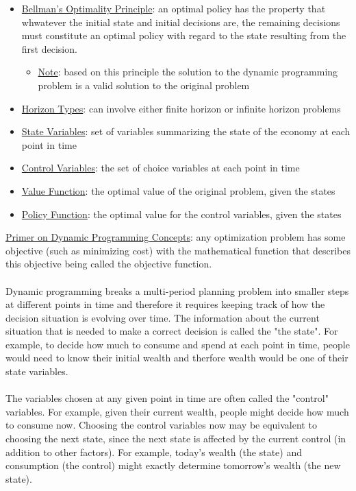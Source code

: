 \documentclass{article}
\begin{document}
\begin{itemize}
    \item \underline{Bellman's Optimality Principle}: an optimal policy has the property that whwatever the initial state and initial decisions are, the remaining decisions must constitute an optimal policy with regard to the state resulting from the first decision.
    \begin{itemize}
        \item \underline{Note}: based on this principle the solution to the dynamic programming problem is a valid solution to the original problem
    \end{itemize}
    \item  \underline{Horizon Types}: can involve either finite horizon or infinite horizon problems
    \item  \underline{State Variables}: set of variables summarizing the state of the economy at each point in time
    \item  \underline{Control Variables}: the set of choice variables at each point in time
    \item  \underline{Value Function}: the optimal value of the original problem, given the states
    \item  \underline{Policy Function}: the optimal value for the control variables, given the states
\end{itemize}
\vspace{2.5mm}
\par \underline{Primer on Dynamic Programming Concepts}: any optimization problem has some objective (such as minimizing cost) with the mathematical function that describes this objective being called the objective function. \\ \\
Dynamic programming breaks a multi-period planning problem into smaller steps at different points in time and therefore it requires keeping track of how the decision situation is evolving over time. The information about the current situation that is needed to make a correct decision is called the "the state". For example, to decide how much to consume and spend at each point in time, people would need to know their initial wealth and therfore wealth would be one of their state variables.\\ \\
The variables chosen at any given point in time are often called the "control" variables. For example, given their current wealth, people might decide how much to consume now. Choosing the control variables now may be equivalent to choosing the next state, since the next state is affected by the current control (in addition to other factors). For example, today's wealth (the state) and consumption (the control) might exactly determine tomorrow's wealth (the new state). \\ \\
\end{document}
